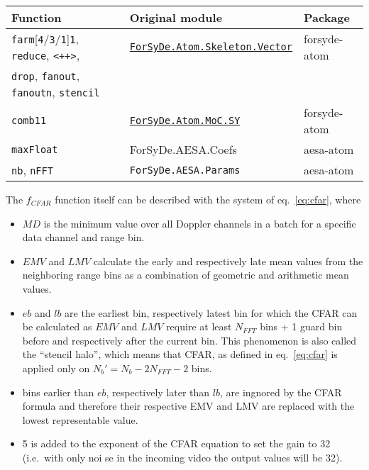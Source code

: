 \documentclass[
  a4paper,
]{article}
\begin{document}
\begin{longtable}[]{@{}lll@{}}
\toprule
Function & Original module & Package\tabularnewline
\midrule
\endhead
\texttt{farm}{[}\texttt{4}/\texttt{3}/\texttt{1}{]}\texttt{1},
\texttt{reduce}, \texttt{\textless{}++\textgreater{}}, &
\href{https://forsyde.github.io/forsyde-atom/api/ForSyDe-Atom-Skeleton-Vector.html}{\texttt{ForSyDe.Atom.Skeleton.Vector}}
& forsyde-atom\tabularnewline
\texttt{drop}, \texttt{fanout}, \texttt{fanoutn}, \texttt{stencil} &
&\tabularnewline
\texttt{comb11} &
\href{https://forsyde.github.io/forsyde-atom/api/ForSyDe-Atom-MoC-SY.html}{\texttt{ForSyDe.Atom.MoC.SY}}
& forsyde-atom\tabularnewline
\texttt{maxFloat} & ForSyDe.AESA.Coefs & aesa-atom\tabularnewline
\texttt{nb}, \texttt{nFFT} & \texttt{ForSyDe.AESA.Params} &
aesa-atom\tabularnewline
\bottomrule
\end{longtable}

The \(f_{CFAR}\) function itself can be described with the system of
eq.~\ref{eq:cfar}, where

\begin{itemize}
\item
  \(MD\) is the minimum value over all Doppler channels in a batch for a
  specific data channel and range bin.
\item
  \(EMV\) and \(LMV\) calculate the early and respectively late mean
  values from the neighboring range bins as a combination of geometric
  and arithmetic mean values.
\item
  \(eb\) and \(lb\) are the earliest bin, respectively latest bin for
  which the CFAR can be calculated as \(EMV\) and \(LMV\) require at
  least \(N_{FFT}\) bins + 1 guard bin before and respectively after the
  current bin. This phenomenon is also called the ``stencil halo'',
  which means that CFAR, as defined in eq.~\ref{eq:cfar} is applied only
  on \(N_b'=N_b-2N_{FFT}-2\) bins.
\item
  bins earlier than \(eb\), respectively later than \(lb\), are ingnored
  by the CFAR formula and therefore their respective EMV and LMV are
  replaced with the lowest representable value.
\item
  5 is added to the exponent of the CFAR equation to set the gain to 32
  (i.e.~with only noi se in the incoming video the output values will be
  32).
\end{itemize}
\end{document}

